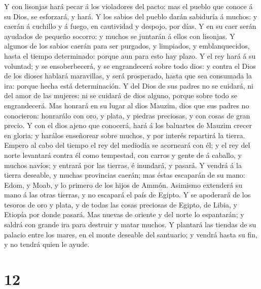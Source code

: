  Y con lisonjas hará pecar á los violadores del pacto:
mas el pueblo que conoce á su Dios, se esforzará, y hará.
 Y los sabios del pueblo darán sabiduría á muchos: y
caerán á cuchillo y á fuego, en cautividad y despojo, por días.
 Y en su caer serán ayudados de pequeño socorro: y muchos
se juntarán á ellos con lisonjas.  Y algunos de los
sabios caerán para ser purgados, y limpiados, y emblanquecidos, hasta el
tiempo determinado: porque aun para esto hay plazo.  Y el
rey hará á su voluntad; y se ensoberbecerá, y se engrandecerá sobre todo
dios: y contra el Dios de los dioses hablará maravillas, y será
prosperado, hasta que sea consumada la ira: porque hecha está
determinación.  Y del Dios de sus padres no se cuidará,
ni del amor de las mujeres: ni se cuidará de dios alguno, porque sobre
todo se engrandecerá.  Mas honrará en su lugar al dios
Mauzim, dios que sus padres no conocieron: honrarálo con oro, y plata, y
piedras preciosas, y con cosas de gran precio.  Y con el
dios ajeno que conocerá, hará á los baluartes de Mauzim crecer en
gloria: y harálos enseñorear sobre muchos, y por interés repartirá la
tierra.  Empero al cabo del tiempo el rey del mediodía se
acorneará con él; y el rey del norte levantará contra él como tempestad,
con carros y gente de á caballo, y muchos navíos; y entrará por las
tierras, é inundará, y pasará.  Y vendrá á la tierra
deseable, y muchas provincias caerán; mas éstas escaparán de su mano:
Edom, y Moab, y lo primero de los hijos de Ammón. 
Asimismo extenderá su mano á las otras tierras, y no escapará el país de
Egipto.  Y se apoderará de los tesoros de oro y plata, y
de todas las cosas preciosas de Egipto, de Libia, y Etiopía por donde
pasará.  Mas nuevas de oriente y del norte lo espantarán;
y saldrá con grande ira para destruir y matar muchos.  Y
plantará las tiendas de su palacio entre los mares, en el monte deseable
del santuario; y vendrá hasta su fin, y no tendrá quien le ayude.

\hypertarget{section-11}{%
\section{12}\label{section-11}}

